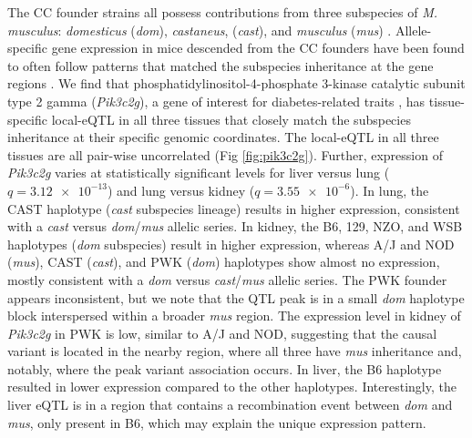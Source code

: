\documentclass[10pt,letterpaper]{article}
\begin{document}
The CC founder strains all possess contributions from three subspecies of \textit{M. musculus}: \textit{domesticus} (\textit{dom}), \textit{castaneus}, (\textit{cast}), and \textit{musculus} (\textit{mus}) \cite{Yang2011}.  Allele-specific gene expression in mice descended from the CC founders have been found to often follow patterns that matched the subspecies inheritance at the gene regions \cite{Crowley2015}.
We find that phosphatidylinositol-4-phosphate 3-kinase catalytic subunit type 2 gamma (\textit{Pik3c2g}), a gene of interest for diabetes-related traits \cite{Braccini2015}, has tissue-specific local-eQTL in all three tissues that closely match the subspecies inheritance at their specific genomic coordinates. The local-eQTL in all three tissues are all pair-wise uncorrelated (Fig \ref{fig:pik3c2g}). Further, expression of \textit{Pik3c2g} varies at statistically significant levels for liver versus lung ($q = \num{3.12e-13}$) and lung versus kidney ($q = \num{3.55e-6}$). 
In lung, the CAST haplotype (\textit{cast} subspecies lineage) results in higher expression, consistent with a \textit{cast} versus \textit{dom}/\textit{mus} allelic series. In kidney, the B6, 129, NZO, and WSB haplotypes  (\textit{dom} subspecies) result in higher expression, whereas A/J and NOD (\textit{mus}), CAST (\textit{cast}), and PWK (\textit{dom}) haplotypes show almost no expression, mostly consistent with a \textit{dom} versus \textit{cast}/\textit{mus} allelic series. The PWK founder appears inconsistent, but we note that the QTL peak is in a small \textit{dom} haplotype block interspersed within a broader \textit{mus} region. The expression level in kidney of \textit{Pik3c2g} in PWK is low, similar to A/J and NOD, suggesting that the causal variant is located in the nearby region, where all three have \textit{mus} inheritance and, notably, where the peak variant association occurs. 
In liver, the B6 haplotype resulted in lower expression compared to the other haplotypes. Interestingly, the liver eQTL is in a region that contains a recombination event between \textit{dom} and \textit{mus}, only present in B6, which may explain the unique expression pattern.
\end{document}
